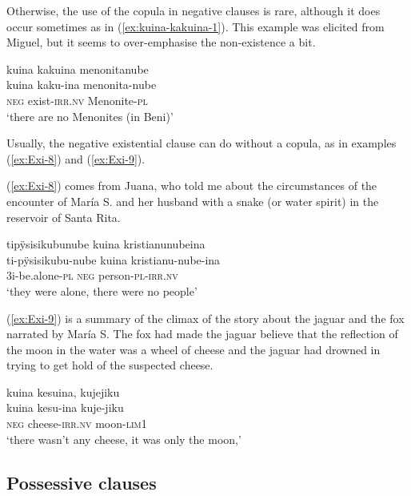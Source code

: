 Otherwise, the use of the copula in negative clauses is rare, although it does occur sometimes as in (\ref{ex:kuina-kakuina-1}). This example was elicited from Miguel, but it seems to over-emphasise the non-existence a bit.

\ea\label{ex:kuina-kakuina-1}
\begingl 
\glpreamble kuina kakuina menonitanube\\
\gla kuina kaku-ina menonita-nube\\ 
\glb \textsc{neg} exist-\textsc{irr.nv} Menonite-\textsc{pl}\\ 
\glft ‘there are no Menonites (in Beni)’\\ 
\endgl
\trailingcitation{[jmx-e090727s.357]}
\xe

Usually, the negative existential clause can do without a copula, as in examples (\ref{ex:Exi-8}) and (\ref{ex:Exi-9}).

(\ref{ex:Exi-8}) comes from Juana, who told me about the circumstances of the encounter of María S. and her husband with a snake (or water spirit) in the reservoir of Santa Rita.

\ea\label{ex:Exi-8}
\begingl
\glpreamble tipÿsisikubunube kuina kristianunubeina\\
\gla ti-pÿsisikubu-nube kuina kristianu-nube-ina\\
\glb 3i-be.alone-\textsc{pl} \textsc{neg} person-\textsc{pl}-\textsc{irr.nv}\\
\glft ‘they were alone, there were no people’
\endgl
\trailingcitation{[jxx-p120515l-2.145]}
\xe

(\ref{ex:Exi-9}) is a summary of the climax of the story about the jaguar and the fox narrated by María S. The fox had made the jaguar believe that the reflection of the moon in the water was a wheel of cheese and the jaguar had drowned in trying to get hold of the suspected cheese.

\ea\label{ex:Exi-9}
\begingl
\glpreamble kuina kesuina, kujejiku\\
\gla kuina kesu-ina kuje-jiku\\
\glb \textsc{neg} cheese-\textsc{irr.nv} moon-\textsc{lim}1\\
\glft ‘there wasn’t any cheese, it was only the moon,’
\endgl
\trailingcitation{[rxx-n120511l-1.044]}
\xe
{}

\subsection{Possessive clauses}\label{sec:PossessiveClauses}

